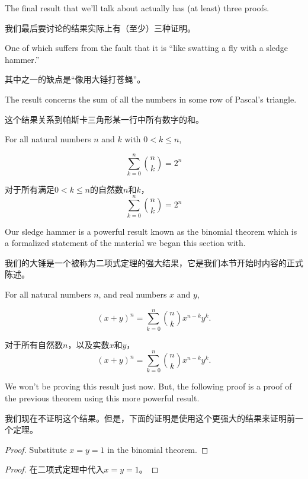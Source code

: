 The final result that we'll talk about actually has (at least) three proofs.

我们最后要讨论的结果实际上有（至少）三种证明。

One of which suffers from the fault that it is ``like swatting a fly
with a sledge hammer.''

其中之一的缺点是“像用大锤打苍蝇”。

The result concerns the sum of all the numbers in some 
row of Pascal's triangle.

这个结果关系到帕斯卡三角形某一行中所有数字的和。

\begin{thm}
For all natural numbers $n$ and $k$ with $0 < k \leq n$,

\[ \sum_{k=0}^n \binom{n}{k} = 2^n \]
\end{thm}

\begin{thm}
对于所有满足$0 < k \leq n$的自然数$n$和$k$，
\[ \sum_{k=0}^n \binom{n}{k} = 2^n \]
\end{thm}

Our sledge hammer is a powerful result known as the binomial theorem
which is a formalized statement of the material we began this section
with.

我们的大锤是一个被称为二项式定理的强大结果，它是我们本节开始时内容的正式陈述。

\begin{thm}
For all natural numbers $n$, and real numbers $x$ and $y$, 

\[ (x+y)^n = \sum_{k=0}^{n} \binom{n}{k} x^{n-k}y^k. \] 
\end{thm}

\begin{thm}[二项式定理]
对于所有自然数$n$，以及实数$x$和$y$，
\[ (x+y)^n = \sum_{k=0}^{n} \binom{n}{k} x^{n-k}y^k. \] 
\end{thm}

We won't be proving this result just now.   But, the following proof
is a proof of the previous theorem using this more powerful result.

我们现在不证明这个结果。但是，下面的证明是使用这个更强大的结果来证明前一个定理。

\begin{proof}
Substitute $x=y=1$ in the binomial theorem.
\end{proof} 

\begin{proof}
在二项式定理中代入$x=y=1$。
\end{proof}

